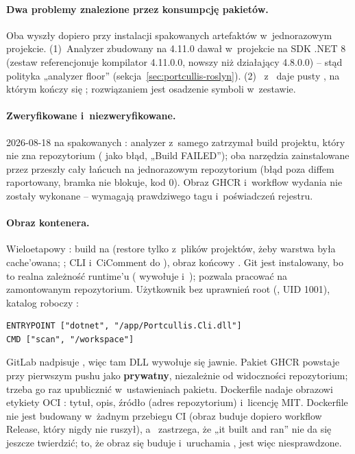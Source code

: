 \paragraph{Dwa problemy znalezione przez konsumpcję pakietów.} Oba wyszły dopiero przy
instalacji spakowanych artefaktów w~jednorazowym projekcie. (1)~Analyzer zbudowany na
 4.11.0 dawał w~projekcie na SDK .NET 8
 (zestaw referencjonuje kompilator 4.11.0.0, nowszy niż działający
4.8.0.0) -- stąd polityka „analyzer floor” (sekcja~\ref{sec:portcullis-roslyn}).
(2)~ z~ daje pusty
, na którym  kończy się ;
rozwiązaniem jest osadzenie symboli w~zestawie.

\paragraph{Zweryfikowane i~niezweryfikowane.} 2026-08-18 na spakowanych :
analyzer z~samego  zatrzymał build projektu, który nie zna
repozytorium ( jako błąd, „Build
FAILED”); oba narzędzia zainstalowane przez  przeszły cały
łańcuch na jednorazowym repozytorium (błąd poza diffem raportowany, bramka nie blokuje,
kod 0). Obraz GHCR i~workflow wydania nie zostały wykonane -- wymagają prawdziwego tagu
i~poświadczeń rejestru.

\paragraph{Obraz kontenera.} Wieloetapowy : build na
 (restore tylko z~plików projektów, żeby warstwa
była cache'owana; ;  CLI i~CiComment
do ), obraz końcowy . Git jest
instalowany, bo to realna zależność runtime'u ( wywołuje
 i~);  pozwala
pracować na zamontowanym repozytorium. Użytkownik bez uprawnień root
(, UID 1001), katalog roboczy :
\begin{lstlisting}
ENTRYPOINT ["dotnet", "/app/Portcullis.Cli.dll"]
CMD ["scan", "/workspace"]
\end{lstlisting}
GitLab nadpisuje , więc tam DLL
wywołuje się jawnie. Pakiet GHCR powstaje przy pierwszym pushu jako \textbf{prywatny},
niezależnie od widoczności repozytorium; trzeba go raz upublicznić w~ustawieniach pakietu.
Dockerfile nadaje obrazowi etykiety OCI : tytuł, opis,
źródło (adres repozytorium) i~licencję MIT. Dockerfile nie jest budowany w~żadnym przebiegu
CI (obraz buduje dopiero workflow Release, który nigdy nie ruszył), a~
zastrzega, że „it built and ran” nie da się jeszcze twierdzić; to, że obraz się buduje
i~uruchamia , jest więc niesprawdzone.


